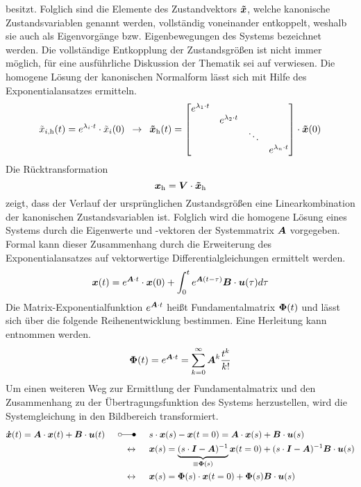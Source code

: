 besitzt. Folglich sind die Elemente des Zustandvektors $\boldsymbol{\tilde{x}}$, welche kanonische Zustandsvariablen genannt werden, vollständig voneinander entkoppelt, weshalb sie auch als  Eigenvorgänge bzw. Eigenbewegungen des Systems bezeichnet werden. Die vollständige Entkopplung der Zustandsgrößen ist nicht immer möglich, für eine ausführliche Diskussion der Thematik sei auf \cite[S. 135 ff.]{LunzeRT1} verwiesen.
Die homogene Lösung der kanonischen Normalform lässt sich mit Hilfe des Exponentialansatzes ermitteln.
\begin{equation}
\tilde{x}_{i\text{,h}}(t) = e^{\lambda_i\cdot t}\cdot \tilde{x}_i(0) \hspace{5pt}\rightarrow\hspace{5pt} \boldsymbol{\tilde{x}}_{\text{h}}(t) = \begin{bmatrix}
e^{\lambda_{\text{1}}\cdot t} &  & \\
& e^{\lambda_{\text{2}}\cdot t}  & \\
&  & \ddots & \\
&  & & e^{\lambda_n\cdot t}
\end{bmatrix}\cdot \boldsymbol{\tilde{x}}(0)
\end{equation}
Die Rücktransformation
\begin{equation}
\boldsymbol{x}_{\text{h}} = \boldsymbol{V}\cdot \boldsymbol{\tilde{x}}_{\text{h}}
\end{equation}
zeigt, dass der Verlauf der ursprünglichen Zustandsgrößen eine Linearkombination der kanonischen Zustandsvariablen ist. Folglich wird die homogene Lösung eines Systems durch die Eigenwerte und -vektoren der Systemmatrix $\boldsymbol{A}$ vorgegeben. 
Formal kann dieser Zusammenhang durch die Erweiterung des Exponentialansatzes auf vektorwertige Differentialgleichungen ermittelt werden.
\begin{equation}
\boldsymbol{x}(t) = e^{\boldsymbol{A}\cdot t}\cdot \boldsymbol{x}(0) + \int^t_0 e^{\boldsymbol{A}(t-\tau)}\boldsymbol{B}\cdot \boldsymbol{u}(\tau)d\tau
\label{eq_fMat_zeitbereich}
\end{equation}
Die Matrix-Exponentialfunktion $e^{\boldsymbol{A}\cdot t}$ heißt Fundamentalmatrix $\boldsymbol{\Phi}(t)$ und lässt sich über die folgende Reihenentwicklung bestimmen. Eine Herleitung kann \cite[S. 6 ff.]{UnbehauenRT2} entnommen werden. 
\begin{equation}
\boldsymbol{\Phi}(t) = e^{\boldsymbol{A}\cdot t} = \sum^{\infty}_{k=0} \boldsymbol{A}^k\frac{t^k}{k!}
\end{equation}
Um einen weiteren Weg zur Ermittlung der Fundamentalmatrix und den Zusammenhang zu der Übertragungsfunktion des Systems herzustellen, wird die Systemgleichung in den Bildbereich transformiert.
\begin{equation}
\begin{split}
\bs{\dot{x}}(t) = \bs{A}\cdot \bs{x}(t) + \bs{B}\cdot\bs{u}(t) \myLaplace &s\cdot\bs{x}(s) - \bs{x}(t=0) = \bs{A}\cdot \bs{x}(s) + \bs{B}\cdot \bs{u}(s)
\\
\leftrightarrow \hspace{15pt} &\bs{x}(s) = \underbrace{(s\cdot \bs{I} - \bs{A})^{-1}}_{\equiv \bs{\Phi}(s)}\bs{x}(t=0) + (s\cdot \bs{I}-\bs{A})^{-1}\bs{B}\cdot \bs{u}(s) 
\\
\leftrightarrow \hspace{15pt}&\bs{x}(s) = \bs{\Phi}(s)\cdot \bs{x}(t=0) +\bs{\Phi}(s)\bs{B}\cdot \bs{u}(s)
\end{split}
\label{eq_fMat_bildbereich}
\end{equation}
